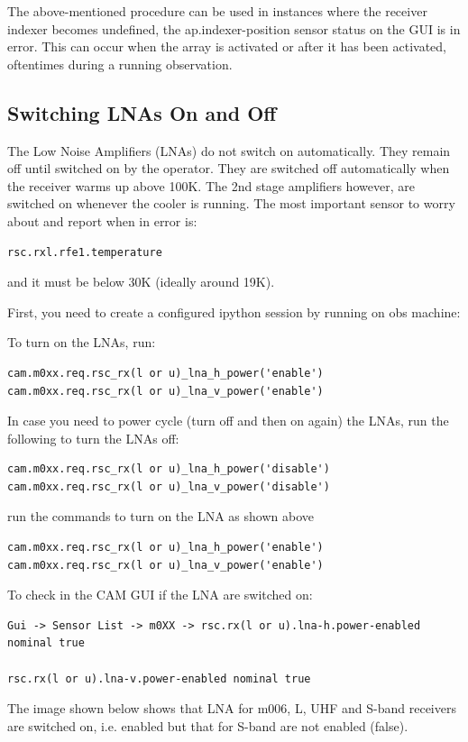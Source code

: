 The above-mentioned procedure can be used in instances where the receiver indexer becomes undefined, the ap.indexer-position sensor status on the GUI is in error. This can occur when the array is activated or after it has been activated, oftentimes during a running observation. 
\subsection{Switching LNAs On and Off}
The Low Noise Amplifiers (LNAs) do not switch on automatically. They remain off until switched on by the operator. They are switched off automatically when the receiver warms up above 100K. The 2nd stage amplifiers however, are switched on whenever the cooler is running. The most important sensor to worry about and report  when in error is:
\begin{lstlisting}[style=DOS]
rsc.rxl.rfe1.temperature 
\end{lstlisting} 
and it must be below 30K (ideally around 19K).

First, you need to create a configured ipython session by running on obs machine:

To turn on the LNAs, run:
\begin{lstlisting}[style=DOS]
cam.m0xx.req.rsc_rx(l or u)_lna_h_power('enable') 
cam.m0xx.req.rsc_rx(l or u)_lna_v_power('enable') 
\end{lstlisting}
In case you need to power cycle (turn off and then on again) the LNAs, run the following to turn the LNAs off:
\begin{lstlisting}[style=DOS]
cam.m0xx.req.rsc_rx(l or u)_lna_h_power('disable') 
cam.m0xx.req.rsc_rx(l or u)_lna_v_power('disable') 
\end{lstlisting}
run the commands to turn on the LNA as shown above
\begin{lstlisting}[style=DOS]
cam.m0xx.req.rsc_rx(l or u)_lna_h_power('enable') 
cam.m0xx.req.rsc_rx(l or u)_lna_v_power('enable') 
\end{lstlisting}
To check in the CAM GUI if the LNA are switched on:
\begin{lstlisting}[style=DOS]
Gui -> Sensor List -> m0XX -> rsc.rx(l or u).lna-h.power-enabled nominal true

rsc.rx(l or u).lna-v.power-enabled nominal true
\end{lstlisting}
The image shown below shows that LNA for m006, L, UHF and S-band receivers are switched on, i.e. enabled but that for S-band are not enabled (false). 

